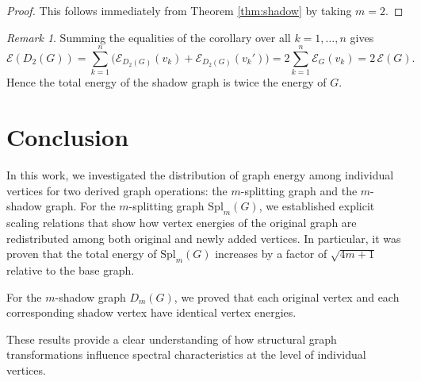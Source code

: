 \documentclass[12pt]{article}
\theoremstyle{plain}
\theoremstyle{remark}
\newtheorem*{remark}{Remark}
\theoremstyle{definition}
\begin{document}
\begin{proof}
	This follows immediately from Theorem \ref{thm:shadow} by taking $m=2$.
\end{proof}

\begin{remark}
	
	Summing the equalities of the corollary over all $k=1,\dots,n$ gives
	\[
	\mathcal{E}(D_2(G))=\sum_{k=1}^n\big(\mathcal{E}_{D_2(G)}(v_k)+\mathcal{E}_{D_2(G)}(v_k')\big)
	=2\sum_{k=1}^n\mathcal{E}_G(v_k)
	=2\,\mathcal{E}(G).
	\]
	Hence the total energy of the shadow graph is twice the energy of $G$.
\end{remark}	\section{Conclusion}
In this work, we investigated the distribution of graph energy among individual vertices for two derived graph operations: the $m$-splitting graph and the $m$-shadow graph. For the $m$-splitting graph $\mathrm{Spl}_m(G)$, we established explicit scaling relations that show how vertex energies of the original graph are redistributed among both original and newly added vertices. In particular, it was proven that the total energy of $\mathrm{Spl}_m(G)$ increases by a factor of $\sqrt{4m+1}$ relative to the base graph.

For the $m$-shadow graph $D_m(G)$, we proved that each original vertex and each corresponding shadow vertex have identical vertex energies.

These results provide a clear understanding of how structural graph transformations influence spectral characteristics at the level of individual vertices.
\end{document}
